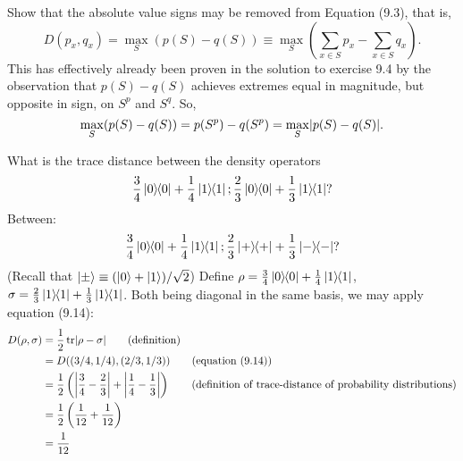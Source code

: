   Show that the absolute value signs may be removed from Equation (9.3), that is, $$D(p_x, q_x) = \max_{S}(p(S)-q(S)) \equiv \max_{S}\left(\sum_{x\in S} p_x - \sum_{x\in S} q_x\right).$$
\Soln This has effectively already been proven in the solution to exercise 9.4 by the observation that $p(S)-q(S)$ achieves extremes equal in magnitude, but opposite in sign, on $S^p$ and $S^q$.  So, $$\max_S(p(S)-q(S)) = p(S^p)-q(S^p) = \max_S\abs{p(S)-q(S)}.$$

\begin{comment}
From eqn (\ref{eq:subsettracedist}) and (\ref{eq:probtracedist}), maximizing $\left|\sum_{x \in S} r_x \right|$ is equivalent to
maximizing $\sum_{x \in S} r_x$.

Hence
\begin{align*}
	D(p_x, q_x) = \max_S (p(S) - q(S)) = \max_S \left(\sum_{x \in S} p_x - \sum_{x \in S}q_x \right).
\end{align*}


\end{comment}
 What is the trace distance between the density operators $$\frac{3}{4}\ket{0}\hspace{-1mm} \bra{0}+\frac{1}{4}\ket{1}\hspace{-1mm} \bra{1}; \frac{2}{3}\ket{0}\hspace{-1mm} \bra{0}+\frac{1}{3}\ket{1}\hspace{-1mm} \bra{1}?$$ Between:  $$\frac{3}{4}\ket{0}\hspace{-1mm} \bra{0}+\frac{1}{4}\ket{1}\hspace{-1mm} \bra{1}; \frac{2}{3}\ket{+}\hspace{-1mm} \bra{+}+\frac{1}{3}\ket{-}\hspace{-1mm} \bra{-}?$$ (Recall that $\ket{\pm} \equiv (\ket{0}+\ket{1})/\sqrt{2}$)
\Soln Define $\rho = \frac{3}{4}\ket{0}\hspace{-1mm} \bra{0} + \frac{1}{4}\ket{1}\hspace{-1mm} \bra{1}$, $\sigma = \frac{2}{3} \ket{1}\hspace{-1mm} \bra{1} + \frac{1}{3}\ket{1}\hspace{-1mm} \bra{1}$.  Both being diagonal in the same basis, we may apply equation (9.14):
\begin{align*}
	D(\rho, \sigma) &= \frac{1}{2} \Tr \abs{\rho - \sigma} \tag{definition}\\
		&= D((3/4, 1/4), (2/3, 1/3)) \tag{equation (9.14)}\\
		&= \frac{1}{2} \left(\left| \frac{3}{4} - \frac{2}{3}  \right| +\left| \frac{1}{4} - \frac{1}{3} \right| \right) \tag{definition of trace-distance of probability distributions}\\
		&= \frac{1}{2} \left( \frac{1}{12} + \frac{1}{12} \right)\\
		&= \frac{1}{12}
\end{align*}


